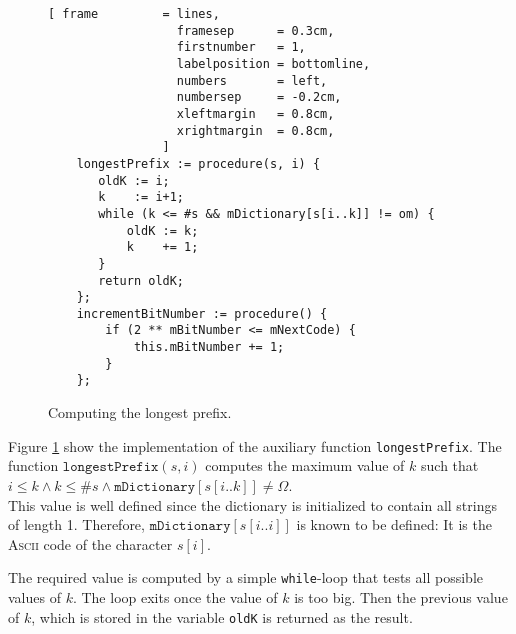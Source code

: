 \begin{figure}[!ht]
\centering
\begin{Verbatim}[ frame         = lines, 
                  framesep      = 0.3cm, 
                  firstnumber   = 1,
                  labelposition = bottomline,
                  numbers       = left,
                  numbersep     = -0.2cm,
                  xleftmargin   = 0.8cm,
                  xrightmargin  = 0.8cm,
                ]
    longestPrefix := procedure(s, i) {
       oldK := i;
       k    := i+1;
       while (k <= #s && mDictionary[s[i..k]] != om) {
           oldK := k;
           k    += 1;
       }
       return oldK;
    };
    incrementBitNumber := procedure() {
        if (2 ** mBitNumber <= mNextCode) {
            this.mBitNumber += 1;
        }
    };
\end{Verbatim}
\vspace*{-0.3cm}
\caption{Computing the longest prefix.}
\label{fig:lzw.stlx-longestPrefix}
\end{figure}
Figure \ref{fig:lzw.stlx-longestPrefix} show the implementation of the auxiliary function
\texttt{longestPrefix}.  
The function $\texttt{longestPrefix}(s, i)$ computes the maximum value of $k$ such that
\\[0.2cm]
\hspace*{1.3cm}
$i \leq k \wedge k \leq \texttt{\#}s \wedge \mathtt{mDictionary}[s[i..k]] \not= \Omega$.
\\[0.2cm]
This value is well defined since the dictionary is initialized to contain all strings of
length 1.  Therefore, $\texttt{mDictionary}[s[i..i]]$ is known to be defined: It is the
\textsc{Ascii} code of the character $s[i]$.
      
The required value is computed by a simple \texttt{while}-loop that tests all possible values of $k$.
The loop exits once the value of $k$ is too big.  Then the previous value of $k$, which is
stored in the variable \texttt{oldK} is returned as the result.




